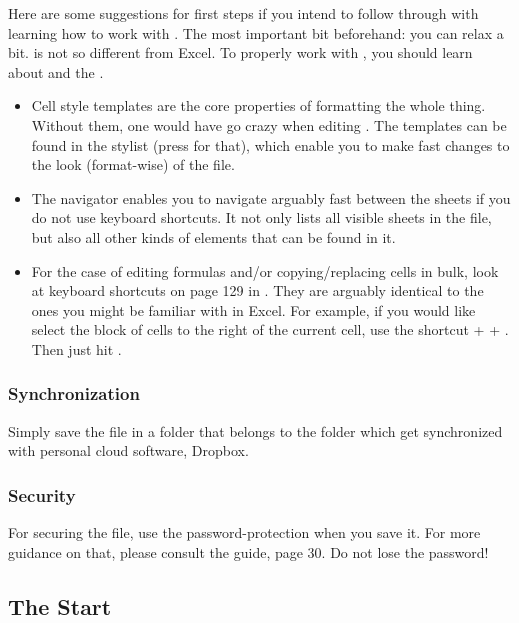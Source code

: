 Here are some suggestions for first steps if you intend to follow through with learning how to work with \loc.
The most important bit beforehand: you can relax a bit. \loc is not so different from Excel.
To properly work with \tfn, you should learn about  and the .
\begin{itemize}
	\item Cell style templates are the core properties of formatting the whole thing.
	Without them, one would have go crazy when editing \tfn.
	The templates can be found in the stylist (press  for that), which enable you to make fast changes to the look (format-wise) of the file.
	\item The navigator enables you to navigate arguably fast between the sheets if you do not use keyboard shortcuts.
	It not only lists all visible sheets in the file, but also all other kinds of elements that can be found in it.
	\item For the case of editing formulas and/or copying/replacing cells in bulk, look at keyboard shortcuts on page 129 in .
	They are arguably identical to the ones you might be familiar with in Excel.
	For example, if you would like select the block of cells to the right of the current cell, use the shortcut  +  + \keystroke{\( \rightarrow \)}.
	Then just hit .
\end{itemize}

\subsubsection{Synchronization}
\label{subsubsec:synchronization}

Simply save the file in a folder that belongs to the folder which get synchronized with personal cloud software, \eg Dropbox.

\subsubsection{Security}
\label{subsubsec:security}

For securing the file, use the password-protection when you save it.
For more guidance on that, please consult the  guide, page 30.
Do not lose the password!

\subsection{The Start}
\label{subsec:opening-the-file}


